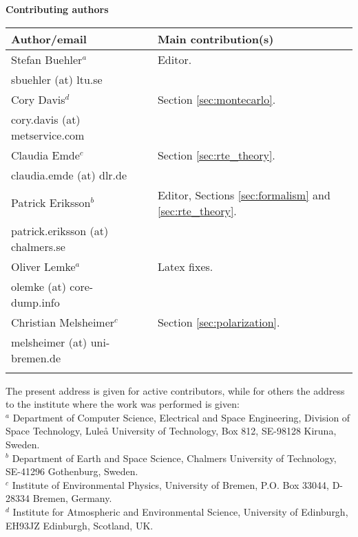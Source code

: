 \documentclass[11pt,twoside,a4paper,fleqn]{book}
\begin{document}
%
\newpage
\thispagestyle{plain}
%
\begin{center}
  {\Large \bf Contributing authors}
\end{center}
\vspace*{10mm}
\begin{tabular}{lp{10mm}l}
  \hline
  {\bf Author/email} & & {\bf Main contribution(s)} \\
  \hline
  Stefan Buehler$^a$ & & Editor.\\
  sbuehler (at) ltu.se & &        \\
  \hline
  Cory Davis$^d$ & & Section \ref{sec:montecarlo}. \\
  cory.davis (at) metservice.com & & \\
  \hline
 Claudia Emde$^c$ & & Section \ref{sec:rte_theory}.\\
  claudia.emde (at) dlr.de & & \\
  \hline
  Patrick Eriksson$^b$ &  & Editor, 
  Sections \ref{sec:formalism} and 
  \ref{sec:rte_theory}.\\
  patrick.eriksson (at) chalmers.se & & \\
  \hline
  Oliver Lemke$^a$ & & Latex fixes.\\
  olemke (at) core-dump.info & & \\
  \hline
  Christian Melsheimer$^c$ & & Section \ref{sec:polarization}.\\
  melsheimer (at) uni-bremen.de & & \\
  \hline
 &&\\
\end{tabular}

\noindent
The present address is given for active contributors, while for others
the address to the institute where the work was performed is given:\\
$^a$ Department of Computer Science, Electrical and Space Engineering,
Division of Space Technology, Lule{\aa} University of Technology, Box
812, SE-98128 Kiruna, Sweden. \\
$^b$ Department of Earth and Space Science, Chalmers University of Technology,
SE-41296 Gothenburg, Sweden. \\
$^c$ Institute of Environmental Physics, University of Bremen, P.O. Box 33044, 
D-28334 Bremen, Germany. \\
$^d$ Institute for Atmospheric and Environmental Science, University of 
Edinburgh, EH93JZ Edinburgh, Scotland, UK. \\
\end{document}
